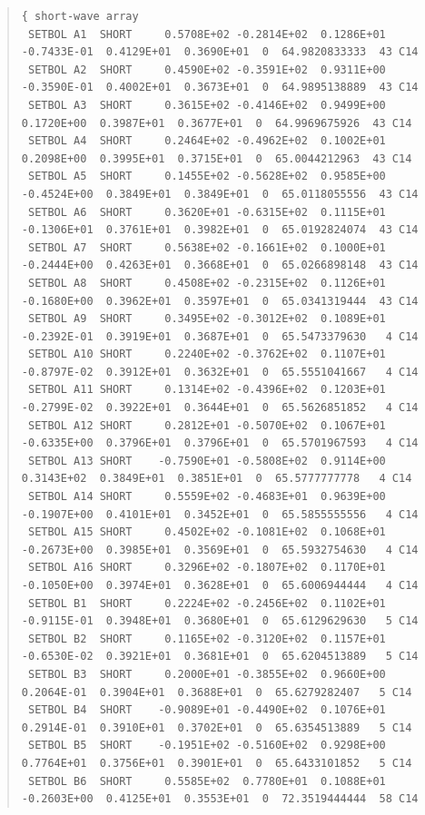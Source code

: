 \documentclass[twoside,11pt]{article}
\newenvironment{myquote}{\begin{quote}\begin{small}}{\end{small}\end{quote}}
\renewcommand{\_}{\texttt{\symbol{95}}}
\begin{document}
\begin{landscape}
\begin{myquote}
\begin{verbatim}
{ short-wave array										
 SETBOL A1  SHORT     0.5708E+02 -0.2814E+02  0.1286E+01 -0.7433E-01  0.4129E+01  0.3690E+01  0  64.9820833333  43 C14        
 SETBOL A2  SHORT     0.4590E+02 -0.3591E+02  0.9311E+00 -0.3590E-01  0.4002E+01  0.3673E+01  0  64.9895138889  43 C14
 SETBOL A3  SHORT     0.3615E+02 -0.4146E+02  0.9499E+00  0.1720E+00  0.3987E+01  0.3677E+01  0  64.9969675926  43 C14
 SETBOL A4  SHORT     0.2464E+02 -0.4962E+02  0.1002E+01  0.2098E+00  0.3995E+01  0.3715E+01  0  65.0044212963  43 C14
 SETBOL A5  SHORT     0.1455E+02 -0.5628E+02  0.9585E+00 -0.4524E+00  0.3849E+01  0.3849E+01  0  65.0118055556  43 C14
 SETBOL A6  SHORT     0.3620E+01 -0.6315E+02  0.1115E+01 -0.1306E+01  0.3761E+01  0.3982E+01  0  65.0192824074  43 C14
 SETBOL A7  SHORT     0.5638E+02 -0.1661E+02  0.1000E+01 -0.2444E+00  0.4263E+01  0.3668E+01  0  65.0266898148  43 C14
 SETBOL A8  SHORT     0.4508E+02 -0.2315E+02  0.1126E+01 -0.1680E+00  0.3962E+01  0.3597E+01  0  65.0341319444  43 C14
 SETBOL A9  SHORT     0.3495E+02 -0.3012E+02  0.1089E+01 -0.2392E-01  0.3919E+01  0.3687E+01  0  65.5473379630   4 C14
 SETBOL A10 SHORT     0.2240E+02 -0.3762E+02  0.1107E+01 -0.8797E-02  0.3912E+01  0.3632E+01  0  65.5551041667   4 C14
 SETBOL A11 SHORT     0.1314E+02 -0.4396E+02  0.1203E+01 -0.2799E-02  0.3922E+01  0.3644E+01  0  65.5626851852   4 C14
 SETBOL A12 SHORT     0.2812E+01 -0.5070E+02  0.1067E+01 -0.6335E+00  0.3796E+01  0.3796E+01  0  65.5701967593   4 C14
 SETBOL A13 SHORT    -0.7590E+01 -0.5808E+02  0.9114E+00  0.3143E+02  0.3849E+01  0.3851E+01  0  65.5777777778   4 C14
 SETBOL A14 SHORT     0.5559E+02 -0.4683E+01  0.9639E+00 -0.1907E+00  0.4101E+01  0.3452E+01  0  65.5855555556   4 C14
 SETBOL A15 SHORT     0.4502E+02 -0.1081E+02  0.1068E+01 -0.2673E+00  0.3985E+01  0.3569E+01  0  65.5932754630   4 C14
 SETBOL A16 SHORT     0.3296E+02 -0.1807E+02  0.1170E+01 -0.1050E+00  0.3974E+01  0.3628E+01  0  65.6006944444   4 C14
 SETBOL B1  SHORT     0.2224E+02 -0.2456E+02  0.1102E+01 -0.9115E-01  0.3948E+01  0.3680E+01  0  65.6129629630   5 C14
 SETBOL B2  SHORT     0.1165E+02 -0.3120E+02  0.1157E+01 -0.6530E-02  0.3921E+01  0.3681E+01  0  65.6204513889   5 C14
 SETBOL B3  SHORT     0.2000E+01 -0.3855E+02  0.9660E+00  0.2064E-01  0.3904E+01  0.3688E+01  0  65.6279282407   5 C14
 SETBOL B4  SHORT    -0.9089E+01 -0.4490E+02  0.1076E+01  0.2914E-01  0.3910E+01  0.3702E+01  0  65.6354513889   5 C14
 SETBOL B5  SHORT    -0.1951E+02 -0.5160E+02  0.9298E+00  0.7764E+01  0.3756E+01  0.3901E+01  0  65.6433101852   5 C14
 SETBOL B6  SHORT     0.5585E+02  0.7780E+01  0.1088E+01 -0.2603E+00  0.4125E+01  0.3553E+01  0  72.3519444444  58 C14

\end{verbatim}
\end{myquote}
\end{landscape}
\end{document}
